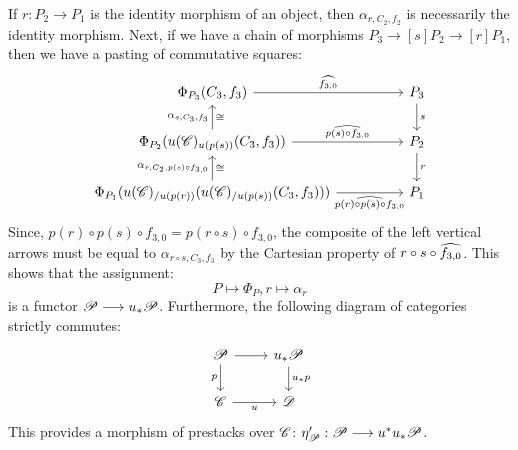 \documentclass[11pt]{amsart}
\begin{document}
\begin{cns}
If $r : P_2 \to P_1$ is the identity morphism of an object, then $\alpha_{r, C_2, f_2}$
is necessarily the identity morphism. Next, if we have a chain of morphisms
$P_3 \to[s] P_2 \to[r] P_1$, then we have a pasting of commutative squares:
\[\begin{tikzcd}[column sep=huge]
\Phi_{P_3}(C_3, f_3)
    \ar[r, "\wh{f_{3, 0}}"]
    \ar[from=d, "\alpha_{s, C_3, f_3}" left, "\cong" right] &
P_3 \ar[d, "s"] \\
\Phi_{P_2}(u(\sC)_{u(p(s))}(C_3, f_3))
    \ar[r, "\wh{p(s) \circ f_{3, 0}}"]
    \ar[from=d, "\alpha_{r, C_2, p(s) \circ f_{3, 0}}" left, "\cong" right] &
P_2 \ar[d, "r"] \\
\Phi_{P_1}(u(\sC)_{/u(p(r))}(u(\sC)_{/u(p(s))}(C_3, f_3)))
    \ar[r, "\wh{p(r) \circ p(s) \circ f_{3, 0}}" below] &
P_1
\end{tikzcd}\]
Since, $p(r) \circ p(s) \circ f_{3, 0} = p(r \circ s) \circ f_{3, 0}$, the composite
of the left vertical arrows must be equal to $\alpha_{r \circ s, C_3, f_3}$ by the Cartesian
property of $r \circ s \circ \widehat{f_{3, 0}}$. This shows that the assignment:
\[
P \mapsto \Phi_P, r \mapsto \alpha_r
\]
is a functor $\sP \to u_*\sP$. Furthermore, the following diagram of categories strictly commutes:
\[\begin{tikzcd}
\sP \ar[r] \ar[d, "p" left] & u_*\sP \ar[d, "u_*p"] \\
\sC \ar[r, "u" below] & \sD
\end{tikzcd}\]
This provides a morphism of prestacks over $\mathscr{C}$: $\eta'_\sP : \sP \to u^*u_*\sP$.
\end{cns}
\end{document}
